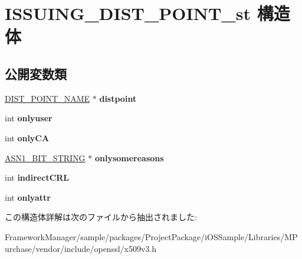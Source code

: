 \hypertarget{struct_i_s_s_u_i_n_g___d_i_s_t___p_o_i_n_t__st}{}\section{I\+S\+S\+U\+I\+N\+G\+\_\+\+D\+I\+S\+T\+\_\+\+P\+O\+I\+N\+T\+\_\+st 構造体}
\label{struct_i_s_s_u_i_n_g___d_i_s_t___p_o_i_n_t__st}
\subsection*{公開変数類}
\begin{DoxyCompactItemize}
\item 
\hypertarget{struct_i_s_s_u_i_n_g___d_i_s_t___p_o_i_n_t__st_aef98ad516a93a8eebe0f38f97515e434}{}\hyperlink{struct_d_i_s_t___p_o_i_n_t___n_a_m_e__st}{D\+I\+S\+T\+\_\+\+P\+O\+I\+N\+T\+\_\+\+N\+A\+M\+E} $\ast$ {\bfseries distpoint}\label{struct_i_s_s_u_i_n_g___d_i_s_t___p_o_i_n_t__st_aef98ad516a93a8eebe0f38f97515e434}

\item 
\hypertarget{struct_i_s_s_u_i_n_g___d_i_s_t___p_o_i_n_t__st_ad0d25508c76cac7e0d7f4bb0ac1d64d3}{}int {\bfseries onlyuser}\label{struct_i_s_s_u_i_n_g___d_i_s_t___p_o_i_n_t__st_ad0d25508c76cac7e0d7f4bb0ac1d64d3}

\item 
\hypertarget{struct_i_s_s_u_i_n_g___d_i_s_t___p_o_i_n_t__st_a12e9fbf6b321e3b7736e78ae24f89d72}{}int {\bfseries only\+C\+A}\label{struct_i_s_s_u_i_n_g___d_i_s_t___p_o_i_n_t__st_a12e9fbf6b321e3b7736e78ae24f89d72}

\item 
\hypertarget{struct_i_s_s_u_i_n_g___d_i_s_t___p_o_i_n_t__st_a87b14dba5e51a2c4cdae476453725cec}{}\hyperlink{structasn1__string__st}{A\+S\+N1\+\_\+\+B\+I\+T\+\_\+\+S\+T\+R\+I\+N\+G} $\ast$ {\bfseries onlysomereasons}\label{struct_i_s_s_u_i_n_g___d_i_s_t___p_o_i_n_t__st_a87b14dba5e51a2c4cdae476453725cec}

\item 
\hypertarget{struct_i_s_s_u_i_n_g___d_i_s_t___p_o_i_n_t__st_a9872380cab3fa8a4d58ae149ca7bac16}{}int {\bfseries indirect\+C\+R\+L}\label{struct_i_s_s_u_i_n_g___d_i_s_t___p_o_i_n_t__st_a9872380cab3fa8a4d58ae149ca7bac16}

\item 
\hypertarget{struct_i_s_s_u_i_n_g___d_i_s_t___p_o_i_n_t__st_abbf8e7d0171fafc31d395b1804490ba5}{}int {\bfseries onlyattr}\label{struct_i_s_s_u_i_n_g___d_i_s_t___p_o_i_n_t__st_abbf8e7d0171fafc31d395b1804490ba5}

\end{DoxyCompactItemize}


この構造体詳解は次のファイルから抽出されました\+:\begin{DoxyCompactItemize}
\item 
Framework\+Manager/sample/packages/\+Project\+Package/i\+O\+S\+Sample/\+Libraries/\+M\+Purchase/vendor/include/openssl/x509v3.\+h\end{DoxyCompactItemize}
